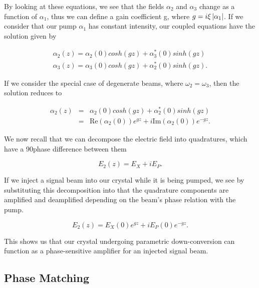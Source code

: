 \noindent
By looking at these equations, we see that the fields $\alpha_2 $ and $\alpha_3$ change as a function of $\alpha_1$, thus we can define a gain coefficient g, where $g = i \xi \left| \alpha_1 \right| $.  If we consider that our pump $\alpha_1$ has constant intensity, our coupled equations have the solution given by \cite{joffre}

\begin{eqnarray}
  \label{eq:pdc_solution}
  \alpha_2(z) = \alpha_2(0) cosh(gz) + \alpha^*_3(0) sinh(gz) \\
  \alpha_3(z) = \alpha_3(0) cosh(gz) + \alpha^*_2(0) sinh(gz) .
\end{eqnarray}

\noindent
If we consider the special case of degenerate beams, where $\omega_2 = \omega_3$, then the solution reduces to

\begin{eqnarray}
  \alpha_2(z) & = & \alpha_2(0) cosh(gz) + \alpha^*_2(0) sinh(gz) \\  
  \label{eq:degen}
  \; & = & \text{Re} \left( \alpha_2(0) \right) e^{gz} + i \text{Im} \left( \alpha_2(0) \right) e^{-gz} .
\end{eqnarray}

\noindent
We now recall that we can decompose the electric field into quadratures, which have a 90\textdegree phase difference between them

\begin{equation}
  \label{eq:e_quad}
  E_2(z) = E_X + i E_P.
\end{equation}

\noindent
If we inject a signal beam into our crystal while it is being pumped, we see by substituting this decomposition into  that the quadrature components are amplified and deamplified depending on the beam's phase relation with the pump.

\begin{equation}
  \label{eq:quad_amp}
  E_2(z) = E_X(0) e^{gz} + i E_P(0) e^{-gz}.
\end{equation}

\noindent
This shows us that our crystal undergoing parametric down-conversion can function as a phase-sensitive amplifier for an injected signal beam.  


\subsection{Phase Matching} 
\label{phase_matching} 

